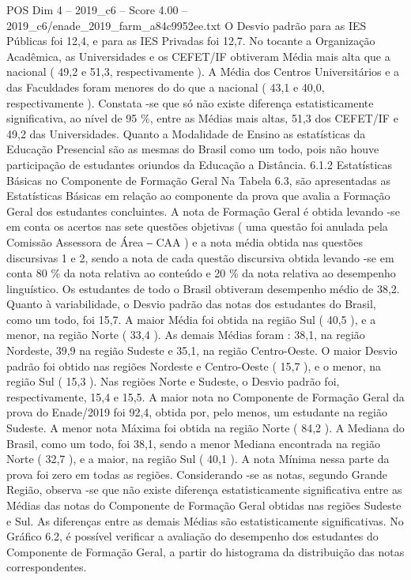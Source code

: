\begin{textsample}{POS Dim 4 – 2019\_c6 – Score 4.00 – 2019\_c6/enade\_2019\_farm\_a84c9952ee.txt}
O Desvio padrão para as IES Públicas foi 12,4, e para as IES Privadas foi 12,7.
No tocante a Organização Acadêmica, as Universidades e os CEFET/IF obtiveram Média mais alta que a nacional ( 49,2 e 51,3, respectivamente ).
A Média dos Centros Universitários e a das Faculdades foram menores do do que a nacional ( 43,1 e 40,0, respectivamente ).
Constata -se que só não existe diferença estatisticamente significativa, ao nível de 95 \%, entre as Médias mais altas, 51,3 dos CEFET/IF e 49,2 das Universidades.
Quanto a Modalidade de Ensino as estatísticas da Educação Presencial são as mesmas do Brasil como um todo, pois não houve participação de estudantes oriundos da Educação a Distância. 6.1.2 Estatísticas Básicas no Componente de Formação Geral Na Tabela 6.3, são apresentadas as Estatísticas Básicas em relação ao componente da prova que avalia a Formação Geral dos estudantes concluintes.
A nota de Formação Geral é obtida levando -se em conta os acertos nas sete questões objetivas ( uma questão foi anulada pela Comissão Assessora de Área ‒ CAA ) e a nota média obtida nas questões discursivas 1 e 2, sendo a nota de cada questão discursiva obtida levando -se em conta 80 \% da nota relativa ao conteúdo e 20 \% da nota relativa ao desempenho linguístico.
Os estudantes de todo o Brasil obtiveram desempenho médio de 38,2.
Quanto à variabilidade, o Desvio padrão das notas dos estudantes do Brasil, como um todo, foi 15,7.
A maior Média foi obtida na região Sul ( 40,5 ), e a menor, na região Norte ( 33,4 ).
As demais Médias foram : 38,1, na região Nordeste, 39,9 na região Sudeste e 35,1, na região Centro-Oeste.
O maior Desvio padrão foi obtido nas regiões Nordeste e Centro-Oeste ( 15,7 ), e o menor, na região Sul ( 15,3 ).
Nas regiões Norte e Sudeste, o Desvio padrão foi, respectivamente, 15,4 e 15,5.
A maior nota no Componente de Formação Geral da prova do Enade/2019 foi 92,4, obtida por, pelo menos, um estudante na região Sudeste.
A menor nota Máxima foi obtida na região Norte ( 84,2 ).
A Mediana do Brasil, como um todo, foi 38,1, sendo a menor Mediana encontrada na região Norte ( 32,7 ), e a maior, na região Sul ( 40,1 ).
A nota Mínima nessa parte da prova foi zero em todas as regiões.
Considerando -se as notas, segundo Grande Região, observa -se que não existe diferença estatisticamente significativa entre as Médias das notas do Componente de Formação Geral obtidas nas regiões Sudeste e Sul.
As diferenças entre as demais Médias são estatisticamente significativas.
No Gráfico 6.2, é possível verificar a avaliação do desempenho dos estudantes do Componente de Formação Geral, a partir do histograma da distribuição das notas correspondentes.

\end{textsample}
